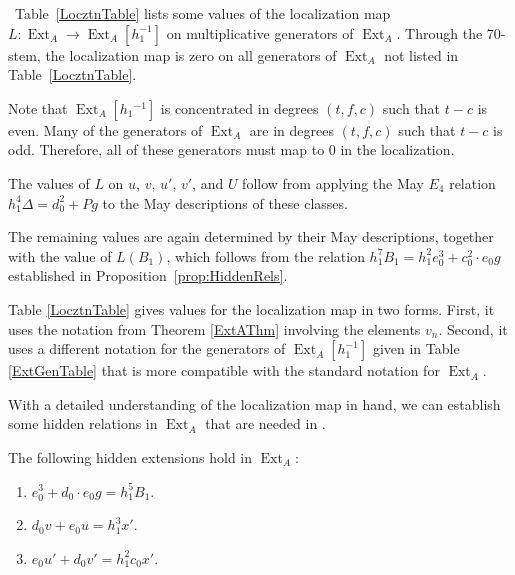 \documentclass[10pt]{amsart}
\begin{document}
\begin{prop}\ 
Table~\ref{LocztnTable} lists some values of the localization map
$L: \operatorname{Ext}_A \rightarrow \operatorname{Ext}_A[h_1^{-1}]$ on multiplicative generators of
$\operatorname{Ext}_A$.  Through the 70-stem, 
the localization map is zero on all generators of $\operatorname{Ext}_A$ not listed
in Table~\ref{LocztnTable}.
\end{prop}

\begin{pf}
Note that $\operatorname{Ext}_A[h_1{^{-1}}]$ is concentrated in degrees $(t,f,c)$ such that 
$t-c$ is even.
Many of the generators of $\operatorname{Ext}_A$ are in degrees $(t,f,c)$ such that $t-c$ 
is odd.  Therefore, all of these generators must map to $0$ in the localization.

The values of $L$ on $u$, $v$, $u'$, $v'$, and $U$ follow from applying the May $E_4$ relation $h_1^4\Delta = d_0^2 + Pg$ to the May descriptions of these classes. 

The remaining values are again determined by their May descriptions, together with the value of $L(B_1)$, which follows from the relation $h_1^7B_1 = h_1^2e_0^3 + c_0^2 \cdot e_0g$ established in Proposition~\ref{prop:HiddenRels}.
\end{pf}

Table \ref{LocztnTable} gives values for the localization map in two forms.
First, it uses the notation from Theorem \ref{ExtAThm} involving the
elements $v_n$.  Second, it uses a different notation for the generators
of $\operatorname{Ext}_A[h_1^{-1}]$ given in Table \ref{ExtGenTable} that is more compatible
with the standard notation for $\operatorname{Ext}_A$.

With a detailed understanding of the localization map in hand, we can establish
some hidden relations in $\operatorname{Ext}_A$ that are needed in \cite{Istems}.

\begin{cor} The following hidden extensions hold in $\operatorname{Ext}_A$:
\begin{enumerate}
\item $e_0^3 + d_0 \cdot e_0g = h_1^5B_1 $.
\item $d_0 v + e_0 u = h_1^3 x'$.
\item $e_0 u' + d_0 v' = h_1^2 c_0 x'$.
\end{enumerate}
\end{cor}
\end{document}
